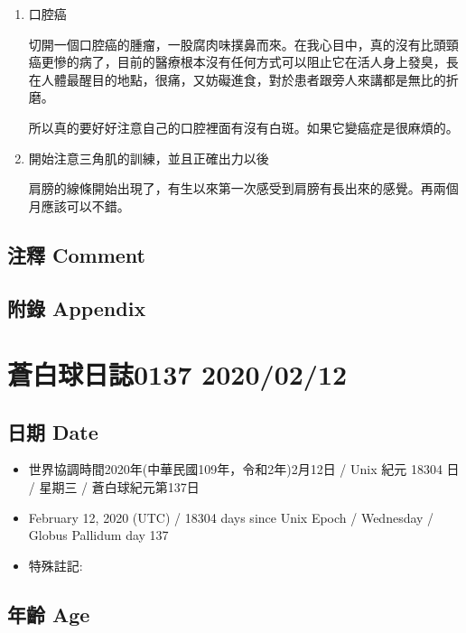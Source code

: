\documentclass[
]{article}
\providecommand{\tightlist}{%
  \setlength{\itemsep}{0pt}\setlength{\parskip}{0pt}}
\begin{document}
\begin{enumerate}
\def\labelenumi{\arabic{enumi}.}
\item
  口腔癌

  切開一個口腔癌的腫瘤，一股腐肉味撲鼻而來。在我心目中，真的沒有比頭頸癌更慘的病了，目前的醫療根本沒有任何方式可以阻止它在活人身上發臭，長在人體最醒目的地點，很痛，又妨礙進食，對於患者跟旁人來講都是無比的折磨。

  所以真的要好好注意自己的口腔裡面有沒有白斑。如果它變癌症是很麻煩的。
\item
  開始注意三角肌的訓練，並且正確出力以後

  肩膀的線條開始出現了，有生以來第一次感受到肩膀有長出來的感覺。再兩個月應該可以不錯。
\end{enumerate}

\hypertarget{ux6ce8ux91cb-comment-71}{%
\subsection{注釋 Comment}\label{ux6ce8ux91cb-comment-71}}

\hypertarget{ux9644ux9304-appendix-72}{%
\subsection{附錄 Appendix}\label{ux9644ux9304-appendix-72}}

\hypertarget{ux84bcux767dux7403ux65e5ux8a8c0137-20200212}{%
\section{蒼白球日誌0137
2020/02/12}\label{ux84bcux767dux7403ux65e5ux8a8c0137-20200212}}

\hypertarget{ux65e5ux671f-date-73}{%
\subsection{日期 Date}\label{ux65e5ux671f-date-73}}

\begin{itemize}
\tightlist
\item
  世界協調時間2020年(中華民國109年，令和2年)2月12日 / Unix 紀元 18304 日
  / 星期三 / 蒼白球紀元第137日
\item
  February 12, 2020 (UTC) / 18304 days since Unix Epoch / Wednesday /
  Globus Pallidum day 137
\item
  特殊註記:
\end{itemize}

\hypertarget{ux5e74ux9f61-age-73}{%
\subsection{年齡 Age}\label{ux5e74ux9f61-age-73}}
\end{document}
